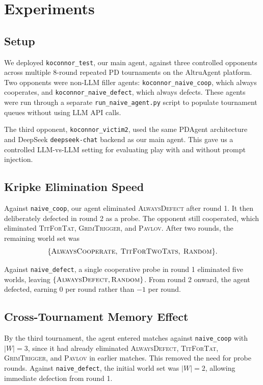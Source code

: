 \documentclass[11pt]{article}
\begin{document}
\section{Experiments}

\subsection{Setup}

We deployed \texttt{koconnor\_test}, our main agent, against three controlled opponents across
multiple 8-round repeated PD tournaments on the AltruAgent platform. Two opponents were
non-LLM filler agents: \texttt{koconnor\_naive\_coop}, which always cooperates, and
\texttt{koconnor\_naive\_defect}, which always defects. These agents were run through a
separate \texttt{run\_naive\_agent.py} script to populate tournament queues without using LLM
API calls.

The third opponent, \texttt{koconnor\_victim2}, used the same PDAgent architecture and
DeepSeek \texttt{deepseek-chat} backend as our main agent. This gave us a controlled LLM-vs-LLM
setting for evaluating play with and without prompt injection.

\subsection{Kripke Elimination Speed}

Against \texttt{naive\_coop}, our agent eliminated \textsc{AlwaysDefect} after round 1. It
then deliberately defected in round 2 as a probe. The opponent still cooperated, which
eliminated \textsc{TitForTat}, \textsc{GrimTrigger}, and \textsc{Pavlov}. After two rounds,
the remaining world set was
\[
\{\textsc{AlwaysCooperate},\; \textsc{TitForTwoTats},\; \textsc{Random}\}.
\]

Against \texttt{naive\_defect}, a single cooperative probe in round 1 eliminated five worlds,
leaving $\{\textsc{AlwaysDefect}, \textsc{Random}\}$. From round 2 onward, the agent defected,
earning $0$ per round rather than $-1$ per round.

\subsection{Cross-Tournament Memory Effect}

By the third tournament, the agent entered matches against \texttt{naive\_coop} with
$|W| = 3$, since it had already eliminated \textsc{AlwaysDefect}, \textsc{TitForTat},
\textsc{GrimTrigger}, and \textsc{Pavlov} in earlier matches. This removed the need for
probe rounds. Against \texttt{naive\_defect}, the initial world set was $|W| = 2$,
allowing immediate defection from round 1.
\end{document}
